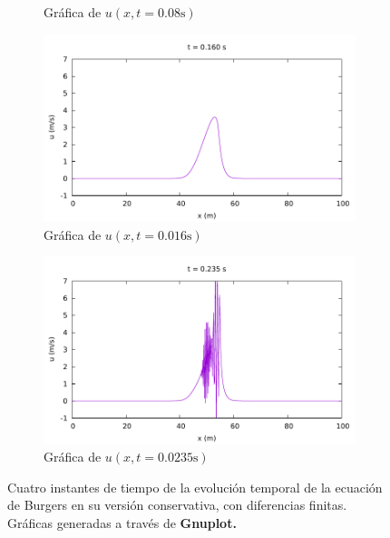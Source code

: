 \documentclass[12pt]{article}
\begin{document}
\begin{figure}[ht]
\begin{subfigure}[b]{0.4\textwidth}
			\caption*{Gráfica de $u(x,t=0.08\unit{\second})$}
			\label{fig:image2}
		\end{subfigure}
		\par\medskip
		\begin{subfigure}[b]{0.4\textwidth}
			\includegraphics[width=\textwidth]{../burgers1DDF/resultados-conservativa/frame032.pdf}
			\caption*{Gráfica de $u(x,t=0.016\unit{\second})$}
			\label{fig:image3}
		\end{subfigure}
		\hfill
		\begin{subfigure}[b]{0.4\textwidth}
			\includegraphics[width=\textwidth]{../burgers1DDF/resultados-conservativa/frame047.pdf}
			\caption*{Gráfica de $u(x,t=0.0235\unit{\second})$}
			\label{fig:image4}
		\end{subfigure}
		\caption{Cuatro instantes de tiempo de la evolución temporal de la ecuación de Burgers en su versión conservativa, con diferencias finitas.  Gráficas generadas a través de \textbf{Gnuplot.}}
		\label{fig:instantes-conservativa}
	\end{figure}
	
\end{document}
